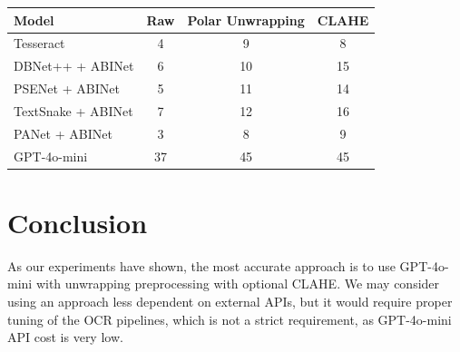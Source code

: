\documentclass{article}
\begin{document}
\begin{table}[H]
    \centering
    \begin{tabular}{|l|c|c|c|}
        \hline
        \textbf{Model}     & \textbf{Raw} & \textbf{Polar Unwrapping} & \textbf{CLAHE} \\
        \hline
        Tesseract          & 4            & 9                         & 8              \\
        \hline
        DBNet++ + ABINet   & 6            & 10                        & 15             \\
        \hline
        PSENet + ABINet    & 5            & 11                        & 14             \\
        \hline
        TextSnake + ABINet & 7            & 12                        & 16             \\
        \hline
        PANet + ABINet     & 3            & 8                         & 9              \\
        \hline
        GPT-4o-mini        & 37           & 45                        & 45             \\
        \hline
    \end{tabular}
\end{table}

\section{Conclusion}

As our experiments have shown, the most accurate approach is to use GPT-4o-mini with unwrapping preprocessing with optional CLAHE. We may consider using an approach less dependent on external APIs, but it would require proper tuning of the OCR pipelines, which is not a strict requirement, as GPT-4o-mini API cost is very low.
\end{document}
